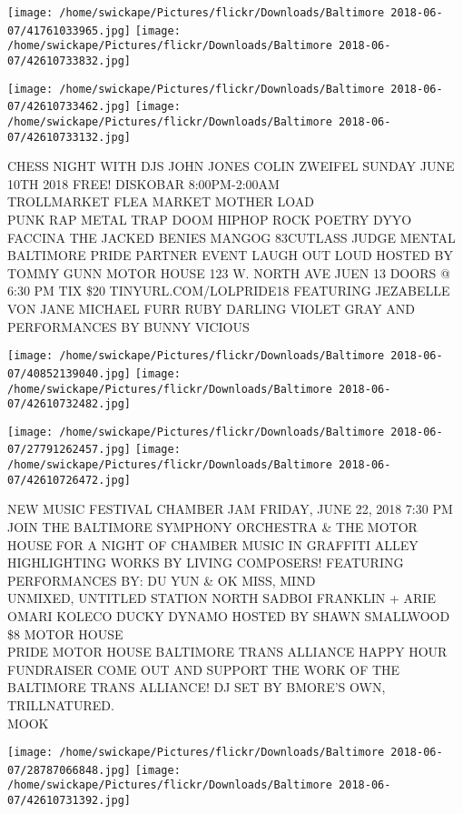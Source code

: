\documentclass[10pt,letterpaper]{article}
\begin{document}
\texttt{[image: /home/swickape/Pictures/flickr/Downloads/Baltimore 2018-06-07/41761033965.jpg]}
\texttt{[image: /home/swickape/Pictures/flickr/Downloads/Baltimore 2018-06-07/42610733832.jpg]}

\texttt{[image: /home/swickape/Pictures/flickr/Downloads/Baltimore 2018-06-07/42610733462.jpg]}
\texttt{[image: /home/swickape/Pictures/flickr/Downloads/Baltimore 2018-06-07/42610733132.jpg]}

CHESS NIGHT WITH DJS JOHN JONES COLIN ZWEIFEL SUNDAY JUNE 10TH 2018 FREE!  DISKOBAR 8:00PM{-}2:00AM\\
TROLLMARKET FLEA MARKET MOTHER LOAD\\
PUNK RAP METAL TRAP DOOM HIPHOP ROCK POETRY DYYO FACCINA THE JACKED BENIES MANGOG 83CUTLASS JUDGE MENTAL\\
BALTIMORE PRIDE PARTNER EVENT LAUGH OUT LOUD HOSTED BY TOMMY GUNN MOTOR HOUSE 123 W. NORTH AVE JUEN 13 DOORS @ 6:30 PM TIX \$20 TINYURL.COM/LOLPRIDE18 FEATURING JEZABELLE VON JANE MICHAEL FURR RUBY DARLING VIOLET GRAY AND PERFORMANCES BY BUNNY VICIOUS\\
\pagebreak

\texttt{[image: /home/swickape/Pictures/flickr/Downloads/Baltimore 2018-06-07/40852139040.jpg]}
\texttt{[image: /home/swickape/Pictures/flickr/Downloads/Baltimore 2018-06-07/42610732482.jpg]}

\texttt{[image: /home/swickape/Pictures/flickr/Downloads/Baltimore 2018-06-07/27791262457.jpg]}
\texttt{[image: /home/swickape/Pictures/flickr/Downloads/Baltimore 2018-06-07/42610726472.jpg]}

NEW MUSIC FESTIVAL CHAMBER JAM FRIDAY, JUNE 22, 2018 7:30 PM JOIN THE BALTIMORE SYMPHONY ORCHESTRA \& THE MOTOR HOUSE FOR A NIGHT OF CHAMBER MUSIC IN GRAFFITI ALLEY HIGHLIGHTING WORKS BY LIVING COMPOSERS!  FEATURING PERFORMANCES BY: DU YUN \& OK MISS, MIND\\
UNMIXED, UNTITLED STATION NORTH SADBOI FRANKLIN + ARIE OMARI KOLECO DUCKY DYNAMO HOSTED BY SHAWN SMALLWOOD \$8 MOTOR HOUSE\\
PRIDE MOTOR HOUSE BALTIMORE TRANS ALLIANCE HAPPY HOUR FUNDRAISER COME OUT AND SUPPORT THE WORK OF THE BALTIMORE TRANS ALLIANCE!  DJ SET BY BMORE'S OWN, TRILLNATURED.\\
MOOK\\
\pagebreak

\texttt{[image: /home/swickape/Pictures/flickr/Downloads/Baltimore 2018-06-07/28787066848.jpg]}
\texttt{[image: /home/swickape/Pictures/flickr/Downloads/Baltimore 2018-06-07/42610731392.jpg]}
\end{document}
